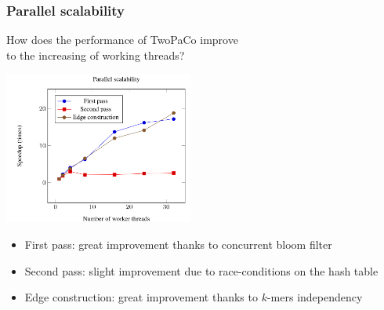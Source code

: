\begin{frame}
	\frametitle{Parallel scalability}
	\centering
	
	How does the performance of TwoPaCo improve \\to the increasing of working threads?
	 
	\includegraphics[height=5cm]{images/scalability}
	
	\begin{itemize}
	  \item First pass: great improvement thanks to concurrent bloom filter
	  \item Second pass: slight improvement due to race-conditions on the hash table
	  \item Edge construction: great improvement thanks to $k$-mers independency
	\end{itemize}
\end{frame}


